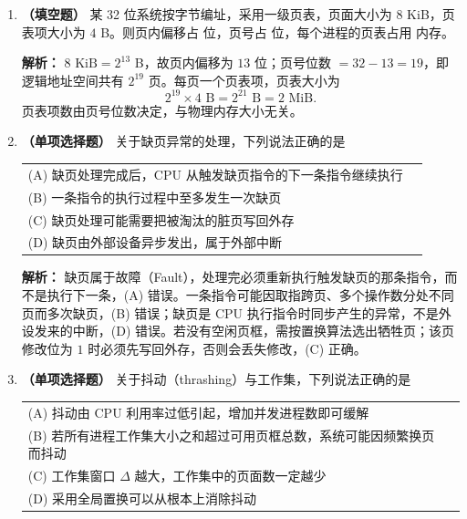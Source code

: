 \begin{enumerate}
\item \textbf{（填空题）} 某 32 位系统按字节编址，采用一级页表，页面大小为 $8$ KiB，页表项大小为 $4$ B。则页内偏移占 \underline{\qquad} 位，页号占 \underline{\qquad} 位，每个进程的页表占用 \underline{\qquad} 内存。

\ifshowsolutions\par\noindent\textbf{解析：} $8\text{ KiB}=2^{13}$ B，故页内偏移为 $13$ 位；页号位数 $=32-13=19$，即逻辑地址空间共有 $2^{19}$ 页。每页一个页表项，页表大小为
\[
2^{19}\times4\text{ B}=2^{21}\text{ B}=2\text{ MiB}.
\]
页表项数由页号位数决定，与物理内存大小无关。\else \answerarea \fi

\item \textbf{（单项选择题）} 关于缺页异常的处理，下列说法正确的是
\begin{center}
\begin{tabular}{ll}
(A) 缺页处理完成后，CPU 从触发缺页指令的下一条指令继续执行 \\[4pt]
(B) 一条指令的执行过程中至多发生一次缺页 \\[4pt]
(C) 缺页处理可能需要把被淘汰的脏页写回外存 \\[4pt]
(D) 缺页由外部设备异步发出，属于外部中断
\end{tabular}
\end{center}

\ifshowsolutions\par\noindent\textbf{解析：} 缺页属于故障（Fault），处理完必须重新执行触发缺页的那条指令，而不是执行下一条，(A) 错误。一条指令可能因取指跨页、多个操作数分处不同页而多次缺页，(B) 错误；缺页是 CPU 执行指令时同步产生的异常，不是外设发来的中断，(D) 错误。若没有空闲页框，需按置换算法选出牺牲页；该页修改位为 $1$ 时必须先写回外存，否则会丢失修改，(C) 正确。\else \answerarea \fi

\item \textbf{（单项选择题）} 关于抖动（thrashing）与工作集，下列说法正确的是
\begin{center}
\begin{tabular}{ll}
(A) 抖动由 CPU 利用率过低引起，增加并发进程数即可缓解 \\[4pt]
(B) 若所有进程工作集大小之和超过可用页框总数，系统可能因频繁换页而抖动 \\[4pt]
(C) 工作集窗口 $\Delta$ 越大，工作集中的页面数一定越少 \\[4pt]
(D) 采用全局置换可以从根本上消除抖动
\end{tabular}
\end{center}


\end{enumerate}
